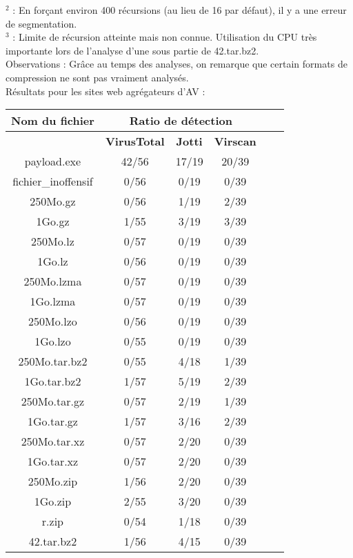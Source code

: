 \documentclass[smallextended]{svjour3}       %
\begin{document}
$^2$ : En forçant environ 400 récursions (au lieu de 16 par défaut), il y a une erreur de segmentation.\\
$^3$ : Limite de récursion atteinte mais non connue. Utilisation du CPU très importante lors de l'analyse d'une sous partie de 42.tar.bz2.\\
Observations : Grâce au temps des analyses, on remarque que certain formats de compression ne sont pas vraiment analysés.
$ $\\
Résultats pour les sites web agrégateurs d'AV :\\
\begin{tabular}{|*{6}{c|}}
    \hline
    \textbf{Nom du fichier} & \multicolumn{3}{|c|}{\textbf{Ratio de détection}}\\
    \hline
  	 & \textbf{VirusTotal} & \textbf{Jotti} & \textbf{Virscan} \\
	\hline
payload.exe & 42/56 & 17/19 & 20/39\\
	\hline
fichier\_inoffensif & 0/56 & 0/19  & 0/39 \\
	\hline
	\hline
250Mo.gz & 0/56 & 1/19 & 2/39 \\
	\hline
1Go.gz &  1/55  & 3/19 & 3/39\\
    \hline
    \hline
250Mo.lz & 0/57 & 0/19 & 0/39\\
	\hline
1Go.lz & 0/56 & 0/19 & 0/39\\
    \hline
    \hline
250Mo.lzma & 0/57 & 0/19 & 0/39\\
	\hline
1Go.lzma & 0/57 & 0/19 & 0/39\\
    \hline
    \hline
250Mo.lzo & 0/56 & 0/19 & 0/39\\
	\hline
1Go.lzo & 0/55 & 0/19 & 0/39\\
    \hline
    \hline
250Mo.tar.bz2 & 0/55 & 4/18 & 1/39\\
	\hline
1Go.tar.bz2 & 1/57 & 5/19 & 2/39\\
    \hline
    \hline
250Mo.tar.gz & 0/57 & 2/19 & 1/39\\
	\hline
1Go.tar.gz & 1/57 & 3/16 & 2/39\\
    \hline
    \hline
250Mo.tar.xz & 0/57 & 2/20 & 0/39\\
	\hline
1Go.tar.xz & 0/57 & 2/20 & 0/39\\
    \hline
    \hline
250Mo.zip & 1/56 & 2/20 & 0/39\\
	\hline
1Go.zip & 2/55 & 3/20 & 0/39\\
    \hline
    \hline
r.zip & 0/54 & 1/18 & 0/39\\
	\hline
42.tar.bz2 & 1/56 & 4/15 & 0/39\\
	\hline
\end{tabular}
\end{document}
